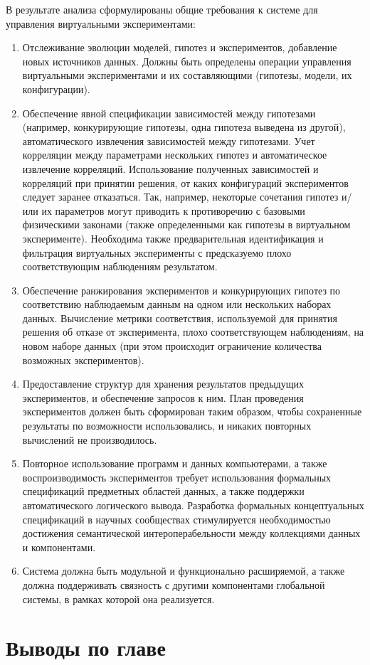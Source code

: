 В результате анализа сформулированы общие требования к системе для управления виртуальными экспериментами:
\begin{enumerate}
    \item Отслеживание эволюции моделей, гипотез и экспериментов, добавление новых источников данных. 
            Должны быть определены операции управления виртуальными экспериментами и их составляющими 
            (гипотезы, модели, их конфигурации).
    \item Обеспечение явной спецификации зависимостей между гипотезами (например, конкурирующие гипотезы, одна гипотеза 
            выведена из другой), автоматического извлечения зависимостей между гипотезами. Учет корреляции между 
            параметрами нескольких гипотез и автоматическое извлечение корреляций. Использование полученных 
            зависимостей и корреляций при принятии решения, от каких конфигураций экспериментов следует заранее 
            отказаться. Так, например, некоторые сочетания гипотез и/или их параметров могут приводить к противоречию с 
            базовыми физическими законами (также определенными как гипотезы в виртуальном эксперименте). Необходима 
            также предварительная идентификация и фильтрация виртуальных эксперименты с предсказуемо плохо 
            соответствующим наблюдениям результатом.
    \item Обеспечение ранжирования экспериментов и конкурирующих гипотез по соответствию наблюдаемым данным на 
            одном или нескольких наборах данных. Вычисление метрики соответствия, используемой для принятия решения об 
            отказе от эксперимента, плохо соответствующем наблюдениям, на новом наборе данных (при этом происходит 
            ограничение количества возможных экспериментов).
    \item Предоставление структур для хранения результатов предыдущих экспериментов, и обеспечение запросов к ним. 
            План проведения экспериментов должен быть сформирован таким образом, чтобы сохраненные результаты по 
            возможности использовались, и никаких повторных вычислений не производилось.
    \item Повторное использование программ и данных компьютерами, а также воспроизводимость экспериментов 
            \cite{Gundersen2018} требует использования формальных спецификаций предметных областей данных, а также 
            поддержки автоматического логического вывода. Разработка формальных концептуальных спецификаций в научных 
            сообществах стимулируется необходимостью достижения семантической интероперабельности между коллекциями 
            данных и компонентами. 
    \item Система должна быть модульной и функционально расширяемой, а также должна поддерживать связность с другими 
            компонентами глобальной системы, в рамках которой она реализуется.
\end{enumerate}

\section{Выводы по главе}\label{sect1_4}

\FloatBarrier
